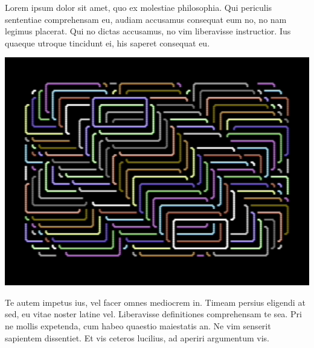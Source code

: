 \begin{minipage}{0.4\textwidth}
Lorem ipsum dolor sit amet, quo ex molestiae philosophia. Qui periculis sententiae comprehensam eu, audiam accusamus consequat eum no, no nam legimus placerat. Qui no dictas accusamus, no vim liberavisse instructior. Ius quaeque utroque tincidunt ei, his saperet consequat eu.
\end{minipage}
\begin{minipage}{0.6\textwidth}
\includegraphics{images/c64/03_boxes.png}
\end{minipage}
Te autem impetus ius, vel facer omnes mediocrem in. Timeam persius eligendi at sed, eu vitae noster latine vel. Liberavisse definitiones comprehensam te sea. Pri ne mollis expetenda, cum habeo quaestio maiestatis an. Ne vim senserit sapientem dissentiet. Et vis ceteros lucilius, ad aperiri argumentum vis.

